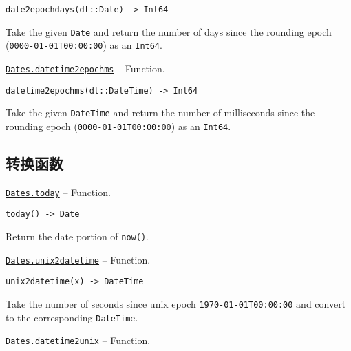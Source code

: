 \begin{adjustwidth}{2em}{0pt}


\begin{verbatim}
date2epochdays(dt::Date) -> Int64
\end{verbatim}

Take the given \texttt{Date} and return the number of days since the rounding epoch (\texttt{0000-01-01T00:00:00}) as an \hyperlink{7720564657383125058}{\texttt{Int64}}.



\end{adjustwidth}
\hypertarget{12248243003394996071}{} 
\hyperlink{12248243003394996071}{\texttt{Dates.datetime2epochms}}  -- {Function.}

\begin{adjustwidth}{2em}{0pt}


\begin{verbatim}
datetime2epochms(dt::DateTime) -> Int64
\end{verbatim}

Take the given \texttt{DateTime} and return the number of milliseconds since the rounding epoch (\texttt{0000-01-01T00:00:00}) as an \hyperlink{7720564657383125058}{\texttt{Int64}}.



\end{adjustwidth}

\hypertarget{7595184717708184953}{}


\subsection{转换函数}


\hypertarget{14772120662961874184}{} 
\hyperlink{14772120662961874184}{\texttt{Dates.today}}  -- {Function.}

\begin{adjustwidth}{2em}{0pt}


\begin{verbatim}
today() -> Date
\end{verbatim}

Return the date portion of \texttt{now()}.



\end{adjustwidth}
\hypertarget{1873675393210620747}{} 
\hyperlink{1873675393210620747}{\texttt{Dates.unix2datetime}}  -- {Function.}

\begin{adjustwidth}{2em}{0pt}


\begin{verbatim}
unix2datetime(x) -> DateTime
\end{verbatim}

Take the number of seconds since unix epoch \texttt{1970-01-01T00:00:00} and convert to the corresponding \texttt{DateTime}.



\end{adjustwidth}
\hypertarget{4964397354460606136}{} 
\hyperlink{4964397354460606136}{\texttt{Dates.datetime2unix}}  -- {Function.}


